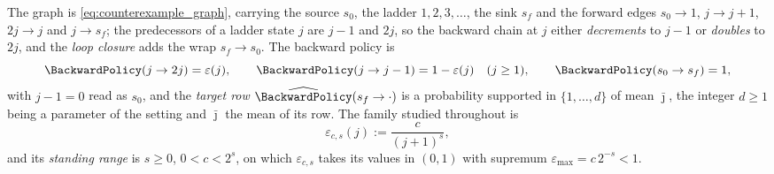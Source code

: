 \begin{definition}\label{def:lean_setting}
The graph is \eqref{eq:counterexample_graph}, carrying the source $s_0$, the ladder
$1,2,3,\dots$, the sink $s_f$ and the forward edges $s_0\rightarrow1$, $j\rightarrow j+1$,
$2j\rightarrow j$ and $j\rightarrow s_f$; the predecessors of a ladder state $j$ are $j-1$ and
$2j$, so the backward chain at $j$ either \emph{decrements} to $j-1$ or \emph{doubles} to $2j$,
and the \emph{loop closure} adds the wrap $s_f\rightarrow s_0$. The backward policy is
\begin{equation}\label{eq:lean_policy}
    \BackwardPolicy(j\rightarrow2j)=\varepsilon(j),\qquad
    \BackwardPolicy(j\rightarrow j-1)=1-\varepsilon(j)\quad(j\geq1),\qquad
    \BackwardPolicy(s_0\rightarrow s_f)=1,
\end{equation}
with $j-1=0$ read as $s_0$, and the \emph{target row}
$\widehat\BackwardPolicy(s_f\rightarrow\cdot)$ is a probability supported in $\{1,\dots,d\}$ of
mean $\bar\jmath$, the integer $d\geq1$ being a parameter of the setting and $\bar\jmath$
the mean of its row. The family studied throughout is
\begin{equation}\label{eq:lean_family}
    \varepsilon_{c,s}(j):=\frac{c}{(j+1)^s},
\end{equation}
and its \emph{standing range} is $s\geq0$, $0<c<2^s$, on which $\varepsilon_{c,s}$ takes its
values in $(0,1)$ with supremum $\varepsilon_{\max}=c\,2^{-s}<1$.


\end{definition}
